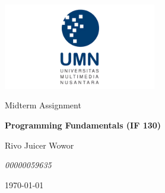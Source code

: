 \documentclass[
  11pt,
  answers  
]{exam}
\newcommand{\mytitle}{Programming Fundamentals (IF 130)}
\newcommand{\theauthor}{Rivo Juicer Wowor}
\newcommand{\affiliation}{00000059635}
\begin{document}
	\begin{titlepage}
		\centering
		\vspace{2cm}
		\includegraphics[width=0.5\textwidth]{../../ref/logoUMN.png}\par\vspace{1cm}
		\vspace{1.5cm}
		\Large{Midterm Assignment} \par
		\vspace{1cm}
		\huge{\textbf{\mytitle}} \par
		\vspace{1.5cm}
		\Large{\theauthor} \par
		\emph{\affiliation} \par
		\vfill
		\today
	\end{titlepage}	
\end{document}
